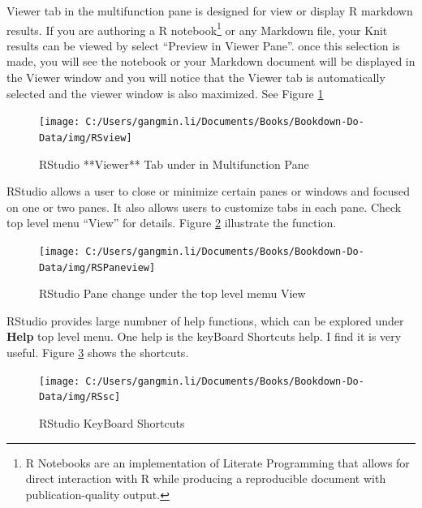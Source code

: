 \documentclass[
]{book}
\begin{document}
Viewer tab in the multifunction pane is designed for view or display R markdown  results. If you are authoring a R notebook\footnote{R Notebooks are an implementation of Literate Programming that allows for direct interaction with R while producing a reproducible document with publication-quality output.} or any Markdown file, your Knit results can be viewed by select ``Preview in Viewer Pane''. once this selection is made, you will see the notebook or your Markdown document will be displayed in the Viewer window and you will notice that the Viewer tab is automatically selected and the viewer window is also maximized. See Figure \ref{fig:SSview}

\begin{figure}

{\centering \texttt{[image: C:/Users/gangmin.li/Documents/Books/Bookdown-Do-Data/img/RSview]} 

}

\caption{RStudio **Viewer** Tab under in Multifunction Pane}\label{fig:SSview}
\end{figure}

RStudio allows a user to close or minimize certain panes or windows and focused on one or two panes. It also allows users to customize tabs in each pane. Check top level menu ``View'' for details. Figure \ref{fig:RSview} illustrate the function.

\begin{figure}

{\centering \texttt{[image: C:/Users/gangmin.li/Documents/Books/Bookdown-Do-Data/img/RSPaneview]} 

}

\caption{RStudio Pane change under the top level memu View}\label{fig:RSview}
\end{figure}

RStudio provides large numbner of help functions, which can be explored under \textbf{Help} top level menu. One help is the keyBoard Shortcuts help. I find it is very useful. Figure \ref{fig:rssc} shows the shortcuts.

\begin{figure}

{\centering \texttt{[image: C:/Users/gangmin.li/Documents/Books/Bookdown-Do-Data/img/RSsc]} 

}

\caption{RStudio KeyBoard Shortcuts}\label{fig:rssc}
\end{figure}
\end{document}
